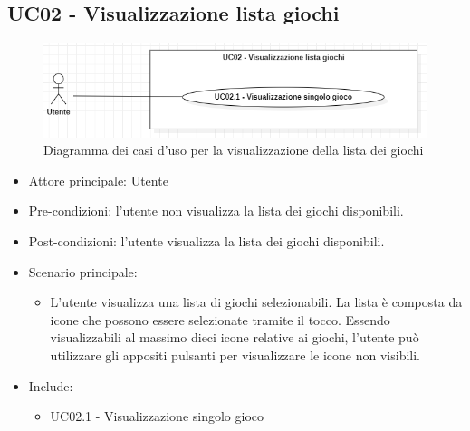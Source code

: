 \subsection{UC02 - Visualizzazione lista giochi}
\begin{figure}[h]
    \centering
    \includegraphics[width=400pt]{images/usecase/UC02.png}
    \caption{Diagramma dei casi d'uso per la visualizzazione della lista dei giochi}
    \label{fig:UC02}
\end{figure}
\begin{itemize}
    \item Attore principale: Utente
    \item Pre-condizioni: l'utente non visualizza la lista dei giochi disponibili.
    \item Post-condizioni: l'utente visualizza la lista dei giochi disponibili.
    \item Scenario principale: \begin{itemize}
        \item L'utente visualizza una lista di giochi selezionabili. La lista è composta da icone che possono essere selezionate tramite il tocco. Essendo visualizzabili al massimo dieci icone relative ai giochi, l'utente può utilizzare gli appositi pulsanti per visualizzare le icone non visibili.
    \end{itemize}
    \item Include: \begin{itemize}
        \item UC02.1 - Visualizzazione singolo gioco
    \end{itemize}
\end{itemize}

